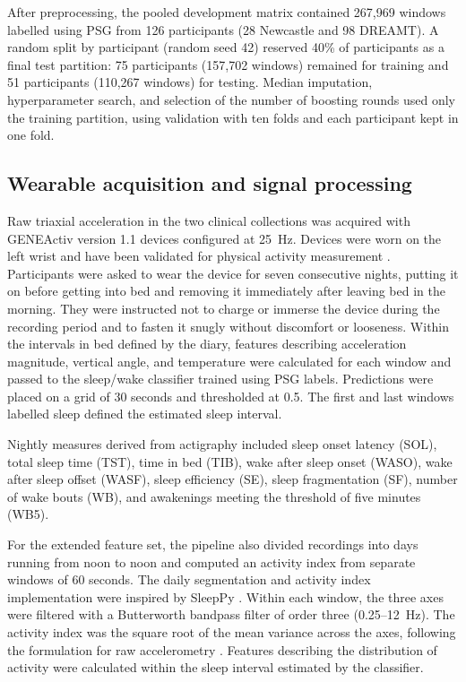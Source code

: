 \documentclass[referee,pdflatex,sn-vancouver-num]{sn-jnl}
\begin{document}
After preprocessing, the pooled development matrix contained 267,969
windows labelled using PSG from 126 participants (28 Newcastle and 98 DREAMT).
A random split by participant (random seed 42) reserved 40\% of participants
as a final test partition: 75 participants (157,702 windows) remained for
training and 51 participants (110,267 windows) for testing. Median imputation,
hyperparameter search, and selection of the number of boosting rounds used only
the training partition, using validation with ten folds and each participant kept in one fold.

\subsection{Wearable acquisition and signal processing}\label{subsec:processing}

Raw triaxial acceleration in the two clinical collections was acquired with
GENEActiv version 1.1 devices configured at 25~Hz. Devices were
worn on the left wrist and have been validated for physical activity
measurement \cite{esliger2011validation}. Participants were asked to wear the
device for seven consecutive nights, putting it on before getting into bed and
removing it immediately after leaving bed in the morning. They were instructed
not to charge or immerse the device during the recording period and to fasten
it snugly without discomfort or looseness. Within
the intervals in bed defined by the diary, features describing acceleration
magnitude, vertical angle, and temperature were calculated for each window and
passed to the sleep/wake classifier trained using PSG labels. Predictions were
placed on a grid of 30 seconds and thresholded at 0.5. The first and last
windows labelled sleep defined the estimated sleep interval.

Nightly measures derived from actigraphy included sleep onset latency (SOL), total sleep
time (TST), time in bed (TIB), wake after sleep onset (WASO), wake after sleep offset (WASF), sleep efficiency (SE), sleep fragmentation (SF),
number of wake bouts (WB), and awakenings meeting the threshold of five minutes (WB5).

For the extended feature set, the pipeline also divided recordings into
days running from noon to noon and computed an activity index from separate
windows of 60 seconds. The daily segmentation and activity index implementation
were inspired by SleepPy \cite{christakis2019sleeppy}. Within each window, the three axes were filtered with a
Butterworth bandpass filter of order three (0.25--12~Hz). The activity index was
the square root of the mean variance across the axes, following the formulation
for raw accelerometry \cite{bai2016activityindex}. Features describing the
distribution of activity were calculated within the sleep interval estimated
by the classifier.
\end{document}

